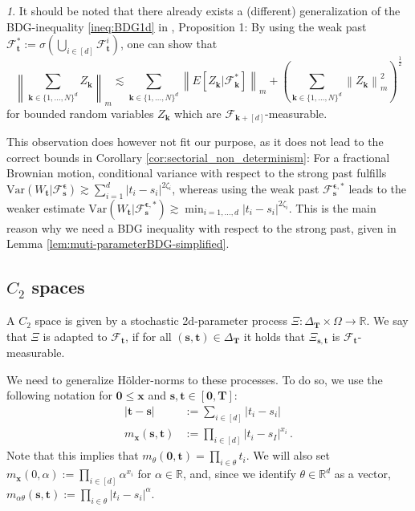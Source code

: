 \documentclass[11pt,oneside,english,reqno]{amsart}
\numberwithin{equation}{section}
\numberwithin{figure}{section}
\theoremstyle{plain}
\theoremstyle{definition}
\theoremstyle{remark}
\newtheorem{rem}[thm]{\protect\remarkname}
\theoremstyle{plain}
\theoremstyle{plain}
\theoremstyle{plain}
\theoremstyle{plain}
\theoremstyle{plain}
\providecommand{\remarkname}{Remark}
\newcommand{\cF}{\mathcal{F}}
\newcommand{\RR}{\mathbb{R}}
\newcommand{\bk}{\mathbf{k}}
\newcommand{\bT}{\mathbf{T}}
\newcommand{\bx}{\mathbf{x}}
\newcommand{\boo}{\mathbf{0}}
\newcommand{\bepsilon}{{\boldsymbol\epsilon}}
\newcommand{\bs}{\mathbf{s}}
\newcommand{\bt}{\mathbf{t}}
\newcommand{\norm}[1]{\left\lVert #1\right\rVert}
\newcommand{\abs}[1]{\left\lvert #1\right\rvert}
\begin{document}
\begin{rem}\label{rem:BDG_for_strong_past}
    It should be noted that there already exists a (different) generalization of the BDG-inequality \eqref{ineq:BDG1d} in \cite{Imkeller85}, Proposition 1: By using the weak past $\cF_\bt^* := \sigma\left(\bigcup_{i\in[d]}\cF^i_\bt\right)$, one can show that
%    
    \begin{equation}\label{BDGImkeller}
    \norm{\sum_{\bk\in \{1,\dots,N\}^d} Z_{\bk}}_m\lesssim \sum_{\bk\in \{1,\dots,N\}^d} \norm{E[Z_\bk\vert\cF_\bk^*]}_m + \left(\sum_{\bk\in \{1,\dots,N\}^d} \norm{Z_\bk}_m^2\right)^{\frac 12}
    \end{equation}
%    
    for bounded random variables $Z_\bk$ which are $\cF_{\bk+[d]}$-measurable. 

    This observation does however not fit our purpose, as it does not lead to the correct bounds in Corollary \ref{cor:sectorial_non_determinism}: For a fractional Brownian motion, conditional variance with respect to the strong past fulfills $\mbox{Var}(W_\bt\vert\cF_\bs^{\bepsilon})\gtrsim\sum_{i=1}^d \abs{t_i-s_i}^{2\zeta_i}$, whereas using the weak past $\cF_\bs^{\bepsilon,*}$ leads to the weaker estimate $\mbox{Var}(W_\bt\vert\cF_\bs^{\bepsilon,*})\gtrsim\min_{i=1,\dots, d} \abs{t_i-s_i}^{2\zeta_i}$. This is the main reason why we need a BDG inequality with respect to the strong past, given in Lemma \ref{lem:muti-parameterBDG-simplified}.
\end{rem}

\subsection{$C_2$ spaces}

A $C_2$ space is given by a stochastic 2d-parameter process $\Xi:\Delta_\bT\times\Omega\to \RR$. We say that $\Xi$ is adapted to $\cF_\bt$, if for all $(\bs,\bt)\in\Delta_\bT$ it holds that $\Xi_{\bs,\bt}$ is $\cF_\bt$-measurable. 

We need to generalize Hölder-norms to these processes. To do so, we use the following notation for $\boo\le\bx$ and $\bs,\bt\in[\boo,\bT]$:
%
\begin{align}
    \abs{\bt-\bs} &:= \sum_{i\in[d]}\abs{t_i-s_i}\\
    m_{\bx}(\bs,\bt) &:= \prod_{i\in[d]}\abs{t_i-s_I}^{x_i}\,.
\end{align}
%
Note that this implies that $m_{\theta}(\boo,\bt) = \prod_{i\in\theta}t_i$. We will also set $m_\bx(0,\alpha) := \prod_{i\in[d]}\alpha^{x_i}$ for $\alpha\in\RR$, and, since we identify $\theta\in\RR^d$ as a vector, $m_{\alpha\theta}(\bs,\bt) := \prod_{i\in\theta}\abs{t_i-s_i}^\alpha$. 
\end{document}

